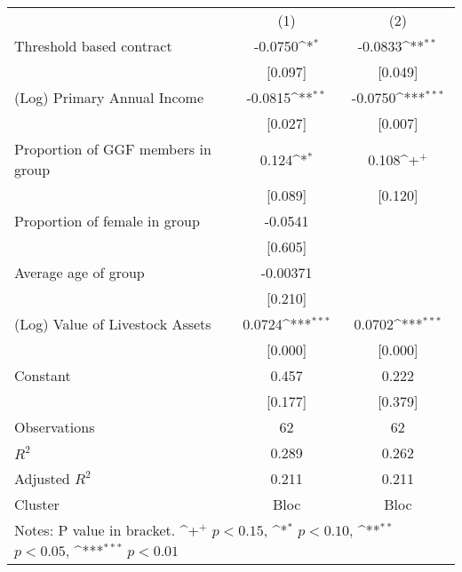 {
\def\sym#1{\ifmmode^{#1}\else\(^{#1}\)\fi}
\begin{tabular*}{0.6\hsize}{@{\hskip\tabcolsep\extracolsep\fill}l*{2}{c}}
\cline{1-3}\cline{1-3}
     &\multicolumn{1}{c}{(1)}         &\multicolumn{1}{c}{(2)}         \\
\cline{1-3}
Threshold based contract&-0.0750\sym{*}  &-0.0833\sym{**} \\
     &[0.097]         &[0.049]         \\
[1em]
(Log) Primary Annual Income&-0.0815\sym{**} &-0.0750\sym{***}\\
     &[0.027]         &[0.007]         \\
[1em]
Proportion of GGF members in group&0.124\sym{*}  &0.108\sym{+}  \\
     &[0.089]         &[0.120]         \\
[1em]
Proportion of female in group&-0.0541         &          \\
     &[0.605]         &          \\
[1em]
Average age of group&-0.00371         &          \\
     &[0.210]         &          \\
[1em]
(Log) Value of Livestock Assets&0.0724\sym{***}&0.0702\sym{***}\\
     &[0.000]         &[0.000]         \\
[1em]
Constant&0.457         &0.222         \\
     &[0.177]         &[0.379]         \\
\cline{1-3}
Observations&62         &62         \\
\(R^{2}\)&0.289         &0.262         \\
Adjusted \(R^{2}\)&0.211         &0.211         \\
Cluster&Bloc         &Bloc         \\
\cline{1-3}\cline{1-3}
\multicolumn{3}{l}{\footnotesize Notes: P value in bracket. \sym{+} \(p<0.15\), \sym{*} \(p<0.10\), \sym{**} \(p<0.05\), \sym{***} \(p<0.01\)}\\
\end{tabular*}
}
